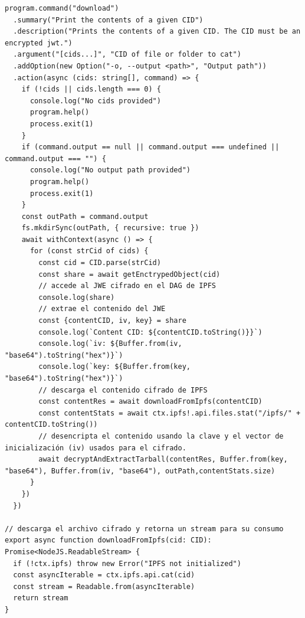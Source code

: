 \begin{verbatim}
program.command("download")
  .summary("Print the contents of a given CID")
  .description("Prints the contents of a given CID. The CID must be an encrypted jwt.")
  .argument("[cids...]", "CID of file or folder to cat")
  .addOption(new Option("-o, --output <path>", "Output path"))
  .action(async (cids: string[], command) => {
    if (!cids || cids.length === 0) {
      console.log("No cids provided")
      program.help()
      process.exit(1)
    }
    if (command.output == null || command.output === undefined || command.output === "") {
      console.log("No output path provided")
      program.help()
      process.exit(1)
    }
    const outPath = command.output
    fs.mkdirSync(outPath, { recursive: true })
    await withContext(async () => {
      for (const strCid of cids) {
        const cid = CID.parse(strCid) 
        const share = await getEnctrypedObject(cid)
        // accede al JWE cifrado en el DAG de IPFS
        console.log(share)
        // extrae el contenido del JWE
        const {contentCID, iv, key} = share
        console.log(`Content CID: ${contentCID.toString()}}`)
        console.log(`iv: ${Buffer.from(iv, "base64").toString("hex")}`)
        console.log(`key: ${Buffer.from(key, "base64").toString("hex")}`)
        // descarga el contenido cifrado de IPFS
        const contentRes = await downloadFromIpfs(contentCID)
        const contentStats = await ctx.ipfs!.api.files.stat("/ipfs/" + contentCID.toString())
        // desencripta el contenido usando la clave y el vector de inicialización (iv) usados para el cifrado.
        await decryptAndExtractTarball(contentRes, Buffer.from(key, "base64"), Buffer.from(iv, "base64"), outPath,contentStats.size)
      }
    })
  })

// descarga el archivo cifrado y retorna un stream para su consumo
export async function downloadFromIpfs(cid: CID): Promise<NodeJS.ReadableStream> {
  if (!ctx.ipfs) throw new Error("IPFS not initialized")
  const asyncIterable = ctx.ipfs.api.cat(cid)
  const stream = Readable.from(asyncIterable)
  return stream
}


\end{verbatim}
